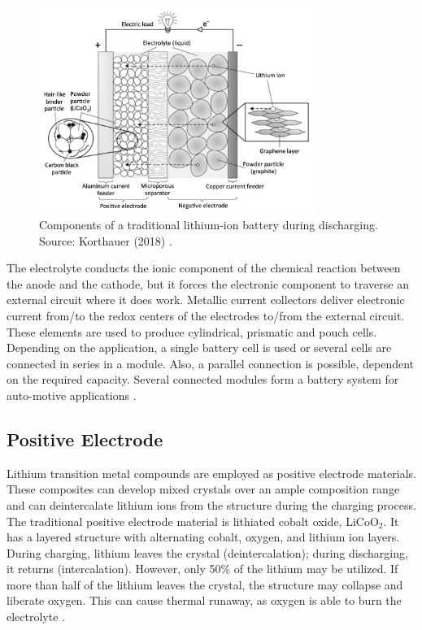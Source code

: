 \begin{figure}
    \centering
    \includegraphics[width=0.8\textwidth]{Images/Chapter1/overview.png}
    \caption[Components of a traditional lithium-ion battery during discharging]{Components of a traditional lithium-ion battery during discharging. Source: Korthauer (2018) \cite{korthauer2018lithium}.}
    \label{fig:lib-overview}
\end{figure}

The electrolyte conducts the ionic component of the chemical reaction between the anode and the cathode, but it forces the electronic component to traverse an external circuit where it does work. Metallic current collectors deliver electronic current from/to the redox centers of the electrodes to/from the external circuit. These elements are used to produce cylindrical, prismatic and pouch cells. Depending on the application, a single battery cell is used or several cells are connected in series in a module. Also, a parallel connection is possible, dependent on the required capacity. Several connected modules form a battery system for auto-motive applications \cite{korthauer2018lithium,goodenough2013li}.

\subsection{Positive Electrode}
\label{sec:positive-electrode}
Lithium transition metal compounds are employed as positive electrode materials. These composites can develop mixed crystals over an ample composition range and can deintercalate lithium ions from the structure during the charging process. The traditional positive electrode material is lithiated cobalt oxide, LiCoO$_2$. It has a layered structure with alternating cobalt, oxygen, and lithium ion layers. During charging, lithium leaves the crystal (deintercalation); during discharging, it returns (intercalation). However, only 50\% of the lithium may be utilized. If more than half of the lithium leaves the crystal, the structure may collapse and liberate oxygen. This can cause thermal runaway, as oxygen is able to burn the electrolyte \cite{korthauer2018lithium,manthiram2020reflection}. 

